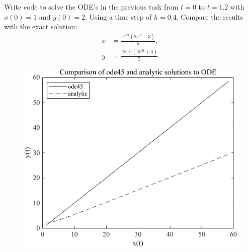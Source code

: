 \documentclass[a4paper, 12pt]{config/homework}
\begin{document}
\vspace{\baselineskip}\noindent
Write code to solve the ODE's in the previous task from \(t=0\) to \(t=1.2\) with \(x(0)=1\) and \(y(0)=2\). Using a time step of \(h=0.4\). Compare the results with the exact solution:
\begin{align*}
x &= \frac{e^{-2t}\left(8e^{5t}-3\right)}{5},
\\ y &= \frac{2e^{-2t}\left(2e^{5t}+3\right)}{5}.
\end{align*}
\begin{figure}[ht]
    \centering
    \includegraphics[width=\textwidth]{../ode_comp.pdf}
\end{figure}
\end{document}
